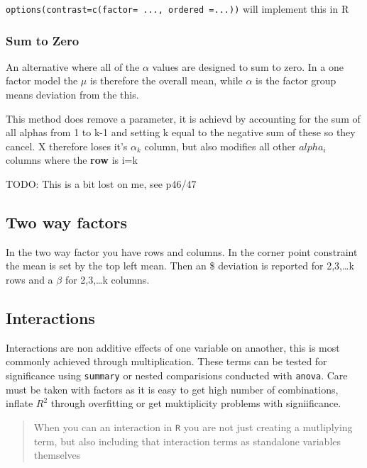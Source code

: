 \documentclass[
  letterpaper,
  DIV=11,
  numbers=noendperiod]{scrreprt}
\begin{document}
\texttt{options(contrast=c(factor=\ ...,\ ordered\ =...))} will
implement this in R

\hypertarget{sum-to-zero}{%
\subsubsection{Sum to Zero}\label{sum-to-zero}}

An alternative where all of the \(\alpha\) values are designed to sum to
zero. In a one factor model the \(\mu\) is therefore the overall mean,
while \(\alpha\) is the factor group means deviation from the this.

This method does remove a parameter, it is achievd by accounting for the
sum of all alphas from 1 to k-1 and setting k equal to the negative sum
of these so they cancel. X therefore loses it's \(\alpha_k\) column, but
also modifies all other \(alpha_i\) columns where the \textbf{row} is
i=k

TODO: This is a bit lost on me, see p46/47

\hypertarget{two-way-factors}{%
\subsection{Two way factors}\label{two-way-factors}}

In the two way factor you have rows and columns. In the corner point
constraint the mean is set by the top left mean. Then an \alpha\$
deviation is reported for 2,3,\ldots k rows and a \(\beta\) for
2,3,\ldots k columns.

\hypertarget{interactions}{%
\subsection{Interactions}\label{interactions}}

Interactions are non additive effects of one variable on anaother, this
is most commonly achieved through multiplication. These terms can be
tested for significance using \texttt{summary} or nested comparisions
conducted with \texttt{anova}. Care must be taken with factors as it is
easy to get high number of combinations, inflate \(R^2\) through
overfitting or get muktiplicity problems with signiificance.

\begin{quote}
When you can an interaction in \texttt{R} you are not just creating a
mutliplying term, but also including that interaction terms as
standalone variables themselves
\end{quote}
\end{document}
